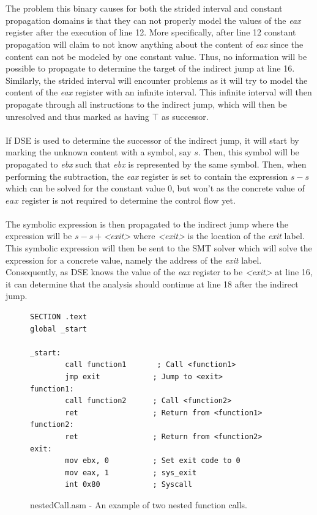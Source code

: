 \documentclass{kththesis}
\renewcommand{\it}[1]{\textit{#1}}
\begin{document}
\\ \\
The problem this binary causes for both the strided interval and constant propagation domains is that they can not properly model the values of the \it{eax} register after the execution of line 12. More specifically, after line 12 constant propagation will claim to not know anything about the content of \it{eax} since the content can not be modeled by one constant value. Thus, no information will be possible to propagate to determine the target of the indirect jump at line 16. Similarly, the strided interval will encounter problems as it will try to model the content of the \it{eax} register with an infinite interval. This infinite interval will then propagate through all instructions to the indirect jump, which will then be unresolved and thus marked as having $\top$ as successor.
\\ \\
If DSE is used to determine the successor of the indirect jump, it will start by marking the unknown content with a symbol, say $s$. Then, this symbol will be propagated to \it{ebx} such that \it{ebx} is represented by the same symbol. Then, when performing the subtraction, the \it{eax} register is set to contain the expression $s - s$ which can be solved for the constant value $0$, but won't as the concrete value of $eax$ register is not required to determine the control flow yet. 
\\ \\ 
The symbolic expression is then propagated to the indirect jump where the expression will be $s - s + $\it{<exit>} where \it{<exit>} is the location of the \it{exit} label. This symbolic expression will then be sent to the SMT solver which will solve the expression for a concrete value, namely the address of the \it{exit} label. Consequently, as DSE knows the value of the \it{eax} register to be \it{<exit>} at line 16, it can determine that the analysis should continue at line 18 after the indirect jump. 
\begin{figure}[!t]
    \centering
\begin{tcolorbox}
\begin{verbatim}
SECTION .text
global _start

_start:
        call function1       ; Call <function1>
        jmp exit            ; Jump to <exit>
function1:
        call function2      ; Call <function2>
        ret                 ; Return from <function1>
function2:
        ret                 ; Return from <function2>
exit:
        mov ebx, 0          ; Set exit code to 0
        mov eax, 1          ; sys_exit
        int 0x80            ; Syscall
\end{verbatim}
\end{tcolorbox}
\caption{nestedCall.asm - An example of two nested function calls.}
    \label{fig:nestedCall.asm}
\end{figure}
\end{document}
